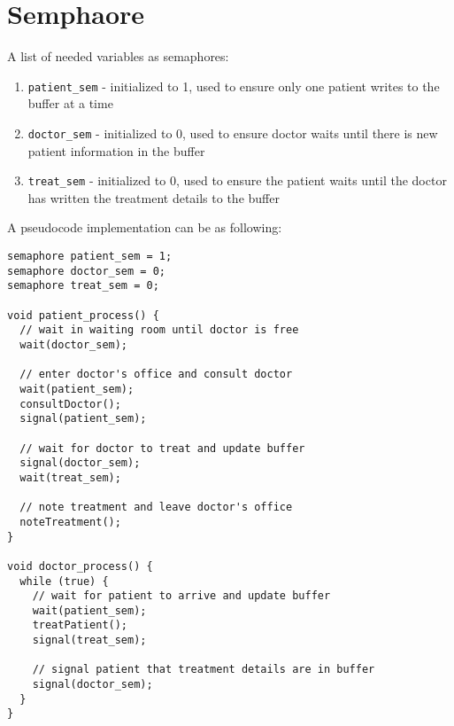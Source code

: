 \documentclass{article}
\def\c#1{\texttt{#1}}
\begin{document}
\section{Semphaore}%
A list of needed variables as semaphores:
\begin{enumerate}
	\item \c{patient\_sem} - initialized to 1, used to ensure only one patient writes to the buffer at a time
	\item \c{doctor\_sem} - initialized to 0, used to ensure doctor waits until there is new patient information in the buffer
	\item \c{treat\_sem} - initialized to 0, used to ensure the patient waits until the doctor has written the treatment details to the buffer
\end{enumerate}
A pseudocode implementation can be as following:
\begin{verbatim}
semaphore patient_sem = 1;
semaphore doctor_sem = 0;
semaphore treat_sem = 0;

void patient_process() {
  // wait in waiting room until doctor is free
  wait(doctor_sem);

  // enter doctor's office and consult doctor
  wait(patient_sem);
  consultDoctor();
  signal(patient_sem);

  // wait for doctor to treat and update buffer
  signal(doctor_sem);
  wait(treat_sem);

  // note treatment and leave doctor's office
  noteTreatment();
}

void doctor_process() {
  while (true) {
    // wait for patient to arrive and update buffer
    wait(patient_sem);
    treatPatient();
    signal(treat_sem);

    // signal patient that treatment details are in buffer
    signal(doctor_sem);
  }
}
\end{verbatim}

\pagebreak
\end{document}
